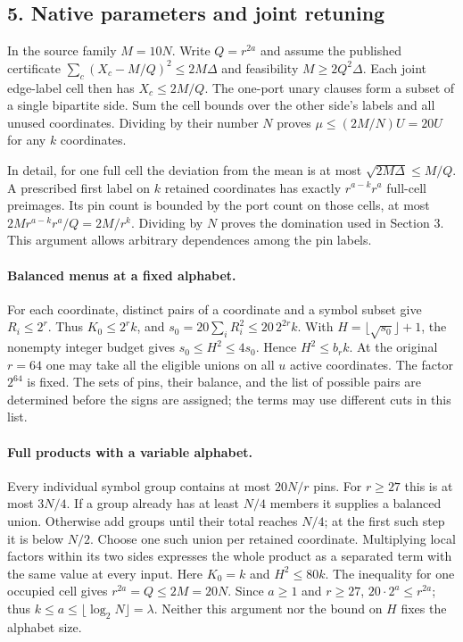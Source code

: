 \documentclass[
  11pt,
]{article}
\newcommand{\floor}[1]{\lfloor #1\rfloor}
\begin{document}
\subsection{5. Native parameters and joint
retuning}\label{native-parameters-and-joint-retuning}

In the source family \(M=10N\). Write \(Q=r^{2a}\) and assume the
published certificate \(\sum_c(X_c-M/Q)^2\le2M\Delta\) and feasibility
\(M\ge2Q^2\Delta\). Each joint edge-label cell then has \(X_c\le2M/Q\).
The one-port unary clauses form a subset of a single bipartite side. Sum
the cell bounds over the other side's labels and all unused coordinates.
Dividing by their number \(N\) proves \(\mu\le(2M/N)U=20U\) for any
\(k\) coordinates.

In detail, for one full cell the deviation from the mean is at most
\(\sqrt{2M\Delta}\le M/Q\). A prescribed first label on \(k\) retained
coordinates has exactly \(r^{a-k}r^a\) full-cell preimages. Its pin count
is bounded by the port count on those cells, at most
\(2M r^{a-k}r^a/Q=2M/r^k\). Dividing by \(N\) proves the domination
used in Section 3. This argument allows arbitrary dependences among the
pin labels.

\paragraph{Balanced menus at a fixed alphabet.}
For each coordinate, distinct pairs of a coordinate and a symbol subset
give \(R_i\le2^r\). Thus \(K_0\le2^r k\), and
\(s_0=20\sum_iR_i^2\le20\,2^{2r}k\). With
\(H=\floor{\sqrt{s_0}}+1\), the nonempty integer budget gives
\(s_0\le H^2\le4s_0\). Hence \(H^2\le b_r k\). At the original
\(r=64\) one may take all the eligible unions on all \(u\) active
coordinates. The factor \(2^{64}\) is fixed. The sets of pins,
their balance, and the list of possible pairs are determined before the
signs are assigned; the terms may use different cuts in this list.

\paragraph{Full products with a variable alphabet.}
Every individual symbol group contains at most \(20N/r\) pins. For
\(r\ge27\) this is at most \(3N/4\). If a group already has at least
\(N/4\) members it supplies a balanced union. Otherwise add groups until
their total reaches \(N/4\); at the first such step it is below \(N/2\).
Choose one such union per retained coordinate. Multiplying local factors
within its two sides expresses the whole product as a separated term with
the same value at every input. Here \(K_0=k\) and \(H^2\le80k\). The
inequality for one occupied cell gives \(r^{2a}=Q\le 2M=20N\).
Since \(a\ge1\) and \(r\ge27\), \(20\cdot2^a\le r^{2a}\);
thus \(k\le a\le\floor{\log_2N}=\lambda\). Neither this argument nor
the bound on \(H\) fixes the alphabet size.
\end{document}
